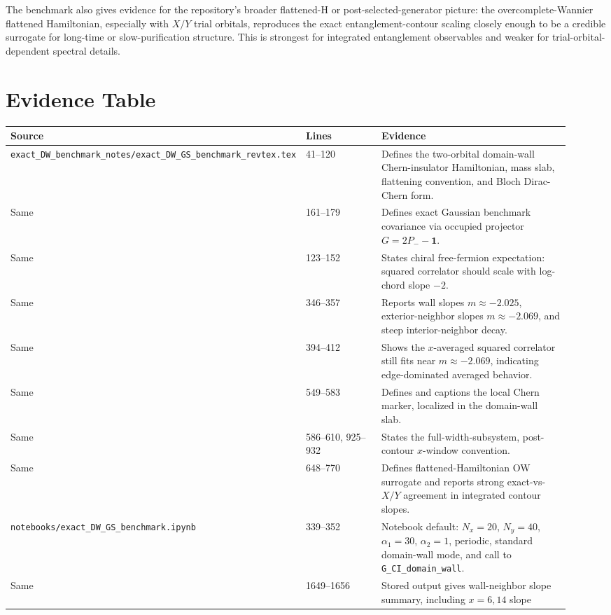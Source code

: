 \documentclass[aps,prb,onecolumn,nofootinbib,superscriptaddress]{revtex4-2}
\begin{document}
The benchmark also gives evidence for the repository's broader flattened-H or
post-selected-generator picture: the overcomplete-Wannier flattened
Hamiltonian, especially with $X/Y$ trial orbitals, reproduces the exact
entanglement-contour scaling closely enough to be a credible surrogate for
long-time or slow-purification structure.  This is strongest for integrated
entanglement observables and weaker for trial-orbital-dependent spectral
details.

\section{Evidence Table}
\begin{ruledtabular}
\begin{tabular}{p{0.27\linewidth}p{0.19\linewidth}p{0.47\linewidth}}
Source & Lines & Evidence \\
\hline
\texttt{exact\_DW\_benchmark\_notes/exact\_DW\_GS\_benchmark\_revtex.tex}
& 41--120
& Defines the two-orbital domain-wall Chern-insulator Hamiltonian, mass slab,
flattening convention, and Bloch Dirac-Chern form. \\
Same & 161--179
& Defines exact Gaussian benchmark covariance via occupied projector
$G=2P_- - \mathbf{1}$. \\
Same & 123--152
& States chiral free-fermion expectation: squared correlator should scale with
log-chord slope $-2$. \\
Same & 346--357
& Reports wall slopes $m\approx -2.025$, exterior-neighbor slopes
$m\approx -2.069$, and steep interior-neighbor decay. \\
Same & 394--412
& Shows the $x$-averaged squared correlator still fits near $m\approx -2.069$,
indicating edge-dominated averaged behavior. \\
Same & 549--583
& Defines and captions the local Chern marker, localized in the domain-wall
slab. \\
Same & 586--610, 925--932
& States the full-width-subsystem, post-contour $x$-window convention. \\
Same & 648--770
& Defines flattened-Hamiltonian OW surrogate and reports strong exact-vs-$X/Y$
agreement in integrated contour slopes. \\
\texttt{notebooks/exact\_DW\_GS\_benchmark.ipynb}
& 339--352
& Notebook default: $N_x=20$, $N_y=40$, $\alpha_1=30$, $\alpha_2=1$,
periodic, standard domain-wall mode, and call to \texttt{G\_CI\_domain\_wall}. \\
Same & 1649--1656
& Stored output gives wall-neighbor slope summary, including $x=6,14$ slope

\end{tabular}
\end{ruledtabular}
\end{document}
